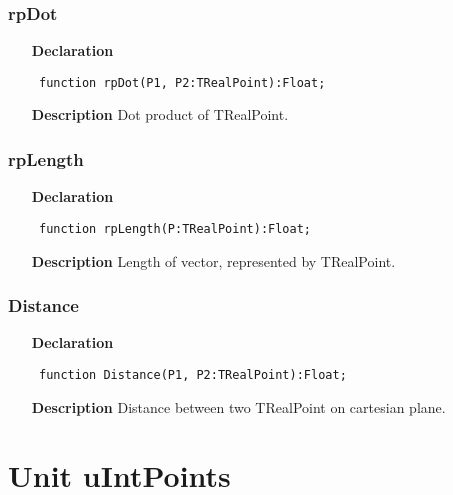 \documentclass[12pt,a4paper,oneside]{report}
\newcommand{\lmath}[1]{   %
	\marginpar{\vspace{#1} 
		\begin{flushright}
			LMath
	\end{flushright} }
}
\newcommand{\declarationitem}[1]{\textbf{#1}}
\newcommand{\descriptiontitle}[1]{\textbf{#1}}
\newcommand{\code}[1]{\texttt{#1}}
\begin{document}
\subsubsection{rpDot}
\label{uRealPoints-rpDot}
\begin{itemize}\item[\declarationitem{Declaration}\hfill]
\begin{flushleft}
\code{
function rpDot(P1, P2:TRealPoint):Float;}
\end{flushleft}
\par
\item[\descriptiontitle{Description}]
Dot product of TRealPoint.
\end{itemize}

\subsubsection{rpLength}
\label{uRealPoints-Length}
\begin{itemize}\item[\declarationitem{Declaration}\hfill]
\begin{flushleft}
\code{
function rpLength(P:TRealPoint):Float;}
\end{flushleft}
\par
\item[\descriptiontitle{Description}]
Length of vector, represented by TRealPoint.
\end{itemize}

\subsubsection{Distance}
\label{uRealPoints-Distance}
\begin{itemize}\item[\declarationitem{Declaration}\hfill]
\begin{flushleft}
\code{
function Distance(P1, P2:TRealPoint):Float;}
\end{flushleft}
\par
\item[\descriptiontitle{Description}]
Distance between two TRealPoint on cartesian plane.
\end{itemize}

\section{Unit uIntPoints}
\lmath{-24pt}
\end{document}
